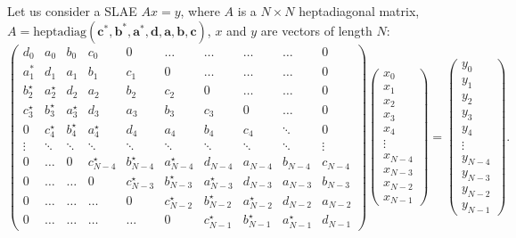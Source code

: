 \documentclass[11pt, a4paper]{article}
\begin{document}
Let us consider a SLAE $Ax = y$, where $A$ is a $N\times N$ heptadiagonal matrix,\\
$A=\textrm{heptadiag}(\mathbf{c^{*}}, \mathbf{b^{*}}, \mathbf{a^{*}}, \mathbf{d},
\mathbf{a}, \mathbf{b}, \mathbf{c})$, $x$ and $y$ are vectors of length $N$:
\begin{equation*}
\begin{pmatrix}
d_{0} & a_{0} & b_{0} & c_{0} & 0 & \dots  & \dots & \dots & \dots & 0 \\
a_{1}^{*} & d_{1} & a_{1} & b_{1} & c_{1} & 0 & \dots & \dots & \dots & 0 \\
b_{2}^{\star} & a_{2}^{\star} & d_{2} & a_{2} & b_{2} & c_{2} & 0 & \dots & \dots & 0 \\
c_{3}^{\star} & b_{3}^{\star} & a_{3}^{\star} & d_{3} & a_{3} & b_{3} & c_{3} & 0 & \dots & 0 \\
0 & c_{4}^{\star} & b_{4}^{\star} & a_{4}^{\star} & d_{4} & a_{4} & b_{4} & c_{4} & \ddots & 0 \\
\vdots & \ddots & \ddots & \ddots & \ddots & \ddots & \ddots & \ddots & \ddots & \vdots \\
0 & \dots & 0 & c_{N-4}^{\star} & b_{N-4}^{\star} & a_{N-4}^{\star} & d_{N-4} & a_{N-4} & b_{N-4} & c_{N-4} \\
0 & \dots & \dots & 0 & c_{N-3}^{\star} & b_{N-3}^{\star} & a_{N-3}^{\star} & d_{N-3} & a_{N-3} & b_{N-3} \\
0 & \dots & \dots & \dots & 0 & c_{N-2}^{\star} & b_{N-2}^{\star} & a_{N-2}^{\star} & d_{N-2} & a_{N-2} \\
0 & \dots & \dots & \dots & \dots & 0 & c_{N-1}^{\star} & b_{N-1}^{\star} & a_{N-1}^{\star} & d_{N-1}
\end{pmatrix}
\begin{pmatrix}
x_{0} \\
x_{1} \\
x_{2} \\
x_{3} \\
x_{4} \\
\vdots \\
x_{N-4} \\
x_{N-3} \\
x_{N-2} \\
x_{N-1}
\end{pmatrix}
=
\begin{pmatrix}
y_{0} \\
y_{1} \\
y_{2} \\
y_{3} \\
y_{4} \\
\vdots \\
y_{N-4} \\
y_{N-3} \\
y_{N-2} \\
y_{N-1}
\end{pmatrix}.
\end{equation*}
\end{document}
